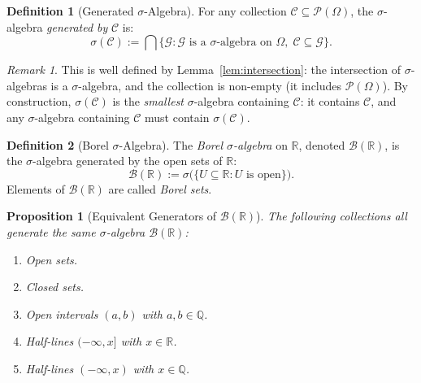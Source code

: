 \documentclass[11pt,a4paper]{article}
\theoremstyle{definition}
\newtheorem{definition}{Definition}[section]
\theoremstyle{plain}
\newtheorem{proposition}[theorem]{Proposition}
\theoremstyle{remark}
\newtheorem{remark}{Remark}[section]
\newcommand{\R}{\mathbb{R}}
\newcommand{\Q}{\mathbb{Q}}
\newcommand{\powerset}{\mathcal{P}}
\newcommand{\Borel}{\mathcal{B}}
\begin{document}
\begin{definition}[Generated $\sigma$-Algebra]
\label{def:generated}
For any collection $\mathcal{C} \subseteq \powerset(\Omega)$, the $\sigma$-algebra
\emph{generated by} $\mathcal{C}$ is:
\begin{equation}
    \sigma(\mathcal{C}) := \bigcap\bigl\{\mathcal{G} : \mathcal{G} \text{ is a $\sigma$-algebra on } \Omega,\; \mathcal{C} \subseteq \mathcal{G}\bigr\}.
    \label{eq:generated}
\end{equation}
\end{definition}

\begin{remark}
This is well defined by Lemma~\ref{lem:intersection}: the intersection of
$\sigma$-algebras is a $\sigma$-algebra, and the collection is non-empty (it
includes $\powerset(\Omega)$). By construction, $\sigma(\mathcal{C})$ is the
\emph{smallest} $\sigma$-algebra containing $\mathcal{C}$: it contains $\mathcal{C}$,
and any $\sigma$-algebra containing $\mathcal{C}$ must contain $\sigma(\mathcal{C})$.
\end{remark}

\begin{definition}[Borel $\sigma$-Algebra]
\label{def:borel}
The \emph{Borel $\sigma$-algebra} on $\R$, denoted $\Borel(\R)$, is the $\sigma$-algebra
generated by the open sets of $\R$:
\begin{equation}
    \Borel(\R) := \sigma\bigl(\{U \subseteq \R : U \text{ is open}\}\bigr).
    \label{eq:borel}
\end{equation}
Elements of $\Borel(\R)$ are called \emph{Borel sets}.
\end{definition}

\begin{proposition}[Equivalent Generators of $\Borel(\R)$]
\label{prop:borel_generators}
The following collections all generate the same $\sigma$-algebra $\Borel(\R)$:
\begin{enumerate}[nosep,label=(\alph*)]
    \item Open sets.
    \item Closed sets.
    \item Open intervals $(a, b)$ with $a, b \in \Q$.
    \item Half-lines $(-\infty, x]$ with $x \in \R$.
    \item Half-lines $(-\infty, x)$ with $x \in \Q$.
\end{enumerate}
\end{proposition}
\end{document}
